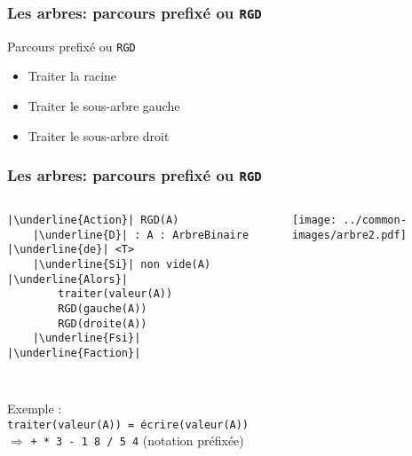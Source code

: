 \documentclass[table,handout,tikz,12pt,svgnames]{beamer}
\begin{document}
\begin{frame}[fragile=singleslide]
	\frametitle{Les arbres: parcours prefixé ou \texttt{RGD}}
	\begin{block}{Parcours prefixé ou \texttt{RGD}}
		\begin{itemize}
			\item Traiter la racine
			\item Traiter le sous-arbre gauche
			\item Traiter le sous-arbre droit
		\end{itemize}
	\end{block}
\end{frame}


\begin{frame}[fragile=singleslide]
	\frametitle{Les arbres: parcours prefixé ou \texttt{RGD}}
	\begin{block}{}
		\begin{columns}[T]
			\begin{column}{0.7\textwidth}
				\begin{verbatim}
|\underline{Action}| RGD(A)
	|\underline{D}| : A : ArbreBinaire |\underline{de}| <T>
	|\underline{Si}| non vide(A) |\underline{Alors}|
		traiter(valeur(A))
		RGD(gauche(A))
		RGD(droite(A))
	|\underline{Fsi}|
|\underline{Faction}|
		
				\end{verbatim}
			\end{column}
			\hspace{-2.5cm}
			\hspace{0.2cm}
			\begin{column}{0.38\textwidth}
				\begin{flushright}
					{\texttt{[image: ../common-images/arbre2.pdf]}}
				\end{flushright}
			\end{column}
		\end{columns}
		\vspace{0.5cm}
		Exemple :\\ \texttt{traiter(valeur(A)) = écrire(valeur(A))}\\
		$\Rightarrow$ \texttt{+ * 3 - 1 8 / 5 4} (notation préfixée)
	\end{block}
\end{frame}
\end{document}

